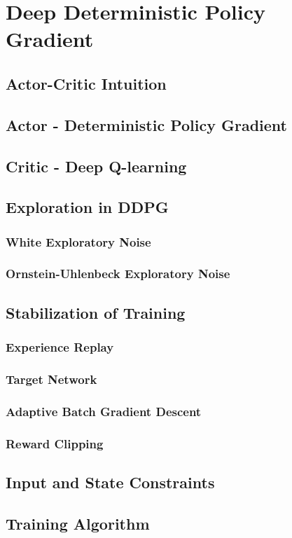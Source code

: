 \section{Deep Deterministic Policy Gradient}
\subsection{Actor-Critic Intuition}
\subsection{Actor - Deterministic Policy Gradient}
\subsection{Critic - Deep Q-learning}

\newpage

\subsection{Exploration in DDPG}
\subsubsection{White Exploratory Noise}
\subsubsection{Ornstein-Uhlenbeck Exploratory Noise}
\subsection{Stabilization of Training}
\subsubsection{Experience Replay}
\subsubsection{Target Network}
\subsubsection{Adaptive Batch Gradient Descent}
\subsubsection{Reward Clipping}
\subsection{Input and State Constraints}
\subsection{Training Algorithm}

